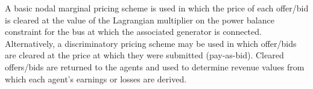 
A basic nodal marginal pricing scheme is used in which the price of each
offer/bid is cleared at the value of the Lagrangian multiplier on the power
balance constraint for the bus at which the associated generator is connected.
Alternatively, a discriminatory pricing scheme may be used in which offer/bids
are cleared at the price at which they were submitted (pay-as-bid). Cleared
offers/bids are returned to the agents and used to determine revenue values
from which each agent's earnings or losses are derived.

%
